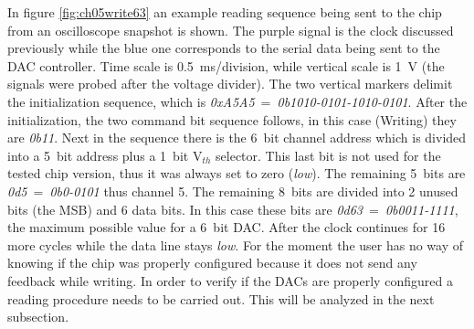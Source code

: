 \noindent In figure \ref{fig:ch05write63} an example reading sequence being sent to the chip from an oscilloscope snapshot is shown.
The purple signal is the clock discussed previously while the blue one corresponds to the serial data being sent to the DAC controller.
Time scale is 0.5~ms/division, while vertical scale is 1~V (the signals were probed after the voltage divider). 
The two vertical markers delimit the initialization sequence, which is \textit{0xA5A5}~=~\textit{0b1010-0101-1010-0101}.
After the initialization, the two command bit sequence follows, in this case (Writing) they are \textit{0b11}.
Next in the sequence there is the 6~bit channel address which is divided into a 5~bit address plus a 1~bit V$_{th}$ selector.
This last bit is not used for the tested chip version, thus it was always set to zero (\textit{low}).
The remaining 5~bits are \textit{0d5}~=~\textit{0b0-0101} thus channel 5. The remaining 8~bits are divided into 2 unused bits (the MSB) and 6 data bits.
In this case these bits are \textit{0d63}~=~\textit{0b0011-1111}, the maximum possible value for a 6~bit DAC.
After the clock continues for 16 more cycles while the data line stays \textit{low}.
For the moment the user has no way of knowing if the chip was properly configured because it does not send any feedback while writing. In order to verify if the DACs are properly configured a reading procedure needs to be carried out. This will be analyzed in the next subsection.  

